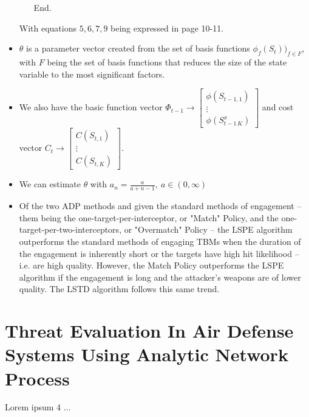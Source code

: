 \documentclass[12pt]{article} %
\begin{document}
\begin{itemize}
\begin{center}
\begin{enumerate}
            End.
        \end{enumerate}
        \end{center}
    With equations $5, 6, 7, 9$ being expressed in page 10-11.\\
    \vspace{0.25cm}
    \item $\theta$ is a parameter vector created from the set of basis functions $\phi_f(S_t))_{f\in F}$, with $F$ being the set of basis functions that reduces the size of the state variable to the most significant factors.
\item We also have the basic function vector $\Phi_{t-1} \rightarrow \left[\begin{array}{c} \phi(S_{t-1,1})  \\ \vdots \\ \phi(S_{t-1\,K}^x)\end{array} \right]$ and cost vector $C_{t} \rightarrow \left[\begin{array}{c} C(S_{t,1}) \\ \vdots \\ C(S_{t,K}) \end{array} \right]$.
\item We can estimate $\theta$ with $a_n = \frac{a}{a+n-1},\ a \in (0, \infty)$

\item Of the two ADP methods and given the standard methods of engagement -- them being the one-target-per-interceptor, or "Match" Policy, and the one-target-per-two-interceptors, or "Overmatch" Policy -- the LSPE algorithm outperforms the standard methods of engaging TBMs when the duration of the engagement is inherently short or the targets have high hit likelihood -- i.e. are high quality. However, the Match Policy outperforms the LSPE algorithm if the engagement is long and the attacker's weapons are of lower quality. The LSTD algorithm follows this same trend.
\end{itemize}

\section*{Threat Evaluation In Air Defense Systems Using Analytic Network Process \cite{Unver2019ThreatEI}}
Lorem ipsum 4 $\ldots$


\newpage
\begin{center}


\end{center}
\end{document}
